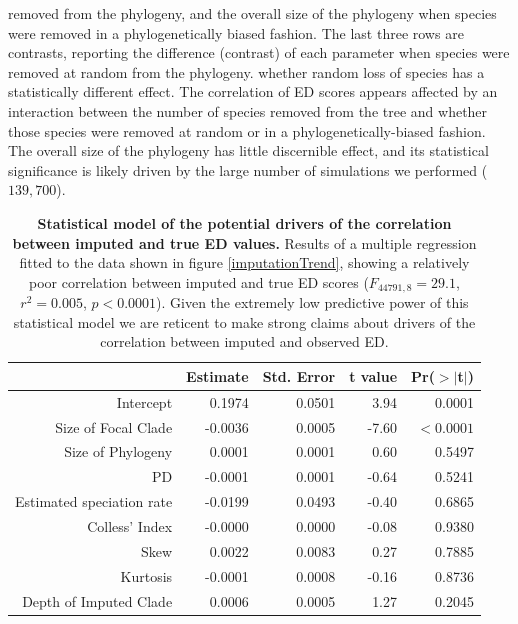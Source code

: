 \documentclass[10pt,english]{article}
\begin{document}
\begin{table}[ht]
{      removed from the phylogeny, and the overall size of the phylogeny when
      species were removed in a phylogenetically biased fashion. The last three
      rows are contrasts, reporting the difference (contrast) of each parameter
      when species were removed at random from the phylogeny. whether random
      loss of species has a statistically different effect. The correlation of
      ED scores appears affected by an interaction between the number of species
      removed from the tree and whether those species were removed at random or
      in a phylogenetically-biased fashion. The overall size of the phylogeny
      has little discernible effect, and its statistical significance is likely
      driven by the large number of simulations we performed ($139,700$).}
\label{missing_regression}
\end{table}

\begin{table}[ht] 
  \centering
  \begin{tabular}{rrrrr}
    \hline
    & Estimate & Std. Error & t value & Pr($>$$|$t$|$) \\
     \hline
     Intercept & 0.1974 & 0.0501 & 3.94 & 0.0001 \\
     Size of Focal Clade & -0.0036 & 0.0005 & -7.60 & $<0.0001$ \\
     Size of Phylogeny & 0.0001 & 0.0001 & 0.60 & 0.5497 \\
     PD & -0.0001 & 0.0001 & -0.64 & 0.5241 \\
     Estimated speciation rate & -0.0199 & 0.0493 & -0.40 & 0.6865 \\
     Colless' Index & -0.0000 & 0.0000 & -0.08 & 0.9380 \\
     Skew & 0.0022 & 0.0083 & 0.27 & 0.7885 \\
     Kurtosis & -0.0001 & 0.0008 & -0.16 & 0.8736 \\
     Depth of Imputed Clade & 0.0006 & 0.0005 & 1.27 & 0.2045 \\ \hline
  \end{tabular}
  \caption{\textbf{Statistical model of the potential drivers of the correlation
      between imputed and true ED values.} Results of a multiple regression
      fitted to the data shown in figure \ref{imputationTrend}, showing a
      relatively poor correlation between imputed and true ED scores
      ($F_{44791,8} = 29.1$, $r^{2} = 0.005$, $p < 0.0001$). Given the extremely
      low predictive power of this statistical model we are reticent to make
      strong claims about drivers of the correlation between imputed and
      observed ED.}
  \label{impute_reg}
\end{table}
\end{document}
